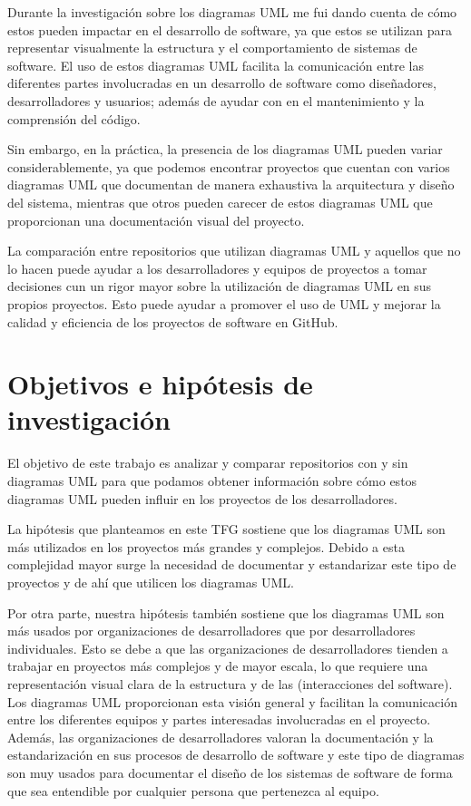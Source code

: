 \documentclass[a4paper, 12pt]{book}
\begin{document}
Durante la investigación sobre los diagramas UML me fui dando cuenta de cómo estos pueden impactar en el desarrollo de software, ya que estos se utilizan para representar visualmente la estructura y el comportamiento de sistemas de software.
El uso de estos diagramas UML facilita la comunicación entre las diferentes partes involucradas en un desarrollo de software como diseñadores, desarrolladores y usuarios; además de ayudar con en el mantenimiento y la comprensión del código.


Sin embargo, en la práctica, la presencia de los diagramas UML pueden variar considerablemente, ya que podemos encontrar proyectos que cuentan con varios diagramas UML que documentan de manera exhaustiva la arquitectura y diseño del sistema, mientras que otros pueden carecer de estos diagramas UML que proporcionan una documentación visual del proyecto.

La comparación entre repositorios que utilizan diagramas UML y aquellos que no lo hacen puede ayudar a los desarrolladores y equipos de proyectos a tomar decisiones cun un rigor mayor sobre la utilización de diagramas UML en sus propios proyectos.
Esto puede ayudar a promover el uso de UML y mejorar la calidad y eficiencia de los proyectos de software en GitHub.


\section{Objetivos e hipótesis de investigación} %
\label{sec:bbjetivos e hipótesis de investigación} %


El objetivo de este trabajo es analizar y comparar repositorios con y sin diagramas UML para que podamos obtener información sobre cómo estos diagramas UML pueden influir en los proyectos de los desarrolladores. 


La hipótesis que planteamos en este TFG sostiene que los diagramas UML son más utilizados en los proyectos más grandes y complejos.
Debido a esta complejidad mayor surge la necesidad de documentar y estandarizar este tipo de proyectos y de ahí que utilicen los diagramas UML.


Por otra parte, nuestra hipótesis también sostiene que los diagramas UML son más usados por organizaciones de desarrolladores que por desarrolladores individuales.
Esto se debe a que las organizaciones de desarrolladores tienden a trabajar en proyectos más complejos y de mayor escala, lo que requiere una representación visual clara de la estructura y de las (interacciones del software).
Los diagramas UML proporcionan esta visión general y facilitan la comunicación entre los diferentes equipos y partes interesadas involucradas en el proyecto.
Además, las organizaciones de desarrolladores valoran la documentación y la estandarización en sus procesos de desarrollo de software y este tipo de diagramas son muy usados para documentar el diseño de los sistemas de software de forma que sea entendible por cualquier persona que pertenezca al equipo.
\end{document}
